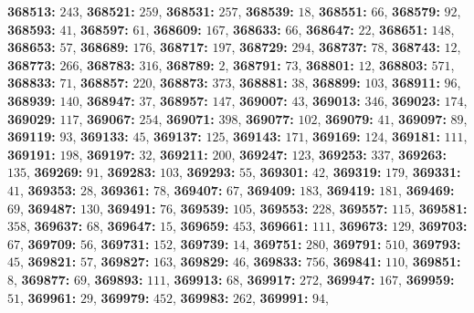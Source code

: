 \textsf{\bfseries 368513:} $243$, \textsf{\bfseries 368521:} $259$, \textsf{\bfseries 368531:} $257$, \textsf{\bfseries 368539:} $18$, \textsf{\bfseries 368551:} $66$, \textsf{\bfseries 368579:} $92$, \textsf{\bfseries 368593:} $41$, \textsf{\bfseries 368597:} $61$, \textsf{\bfseries 368609:} $167$, \textsf{\bfseries 368633:} $66$, \textsf{\bfseries 368647:} $22$, \textsf{\bfseries 368651:} $148$, \textsf{\bfseries 368653:} $57$, \textsf{\bfseries 368689:} $176$, \textsf{\bfseries 368717:} $197$, \textsf{\bfseries 368729:} $294$, \textsf{\bfseries 368737:} $78$, \textsf{\bfseries 368743:} $12$, \textsf{\bfseries 368773:} $266$, \textsf{\bfseries 368783:} $316$, \textsf{\bfseries 368789:} $2$, \textsf{\bfseries 368791:} $73$, \textsf{\bfseries 368801:} $12$, \textsf{\bfseries 368803:} $571$, \textsf{\bfseries 368833:} $71$, \textsf{\bfseries 368857:} $220$, \textsf{\bfseries 368873:} $373$, \textsf{\bfseries 368881:} $38$, \textsf{\bfseries 368899:} $103$, \textsf{\bfseries 368911:} $96$, \textsf{\bfseries 368939:} $140$, \textsf{\bfseries 368947:} $37$, \textsf{\bfseries 368957:} $147$, \textsf{\bfseries 369007:} $43$, \textsf{\bfseries 369013:} $346$, \textsf{\bfseries 369023:} $174$, \textsf{\bfseries 369029:} $117$, \textsf{\bfseries 369067:} $254$, \textsf{\bfseries 369071:} $398$, \textsf{\bfseries 369077:} $102$, \textsf{\bfseries 369079:} $41$, \textsf{\bfseries 369097:} $89$, \textsf{\bfseries 369119:} $93$, \textsf{\bfseries 369133:} $45$, \textsf{\bfseries 369137:} $125$, \textsf{\bfseries 369143:} $171$, \textsf{\bfseries 369169:} $124$, \textsf{\bfseries 369181:} $111$, \textsf{\bfseries 369191:} $198$, \textsf{\bfseries 369197:} $32$, \textsf{\bfseries 369211:} $200$, \textsf{\bfseries 369247:} $123$, \textsf{\bfseries 369253:} $337$, \textsf{\bfseries 369263:} $135$, \textsf{\bfseries 369269:} $91$, \textsf{\bfseries 369283:} $103$, \textsf{\bfseries 369293:} $55$, \textsf{\bfseries 369301:} $42$, \textsf{\bfseries 369319:} $179$, \textsf{\bfseries 369331:} $41$, \textsf{\bfseries 369353:} $28$, \textsf{\bfseries 369361:} $78$, \textsf{\bfseries 369407:} $67$, \textsf{\bfseries 369409:} $183$, \textsf{\bfseries 369419:} $181$, \textsf{\bfseries 369469:} $69$, \textsf{\bfseries 369487:} $130$, \textsf{\bfseries 369491:} $76$, \textsf{\bfseries 369539:} $105$, \textsf{\bfseries 369553:} $228$, \textsf{\bfseries 369557:} $115$, \textsf{\bfseries 369581:} $358$, \textsf{\bfseries 369637:} $68$, \textsf{\bfseries 369647:} $15$, \textsf{\bfseries 369659:} $453$, \textsf{\bfseries 369661:} $111$, \textsf{\bfseries 369673:} $129$, \textsf{\bfseries 369703:} $67$, \textsf{\bfseries 369709:} $56$, \textsf{\bfseries 369731:} $152$, \textsf{\bfseries 369739:} $14$, \textsf{\bfseries 369751:} $280$, \textsf{\bfseries 369791:} $510$, \textsf{\bfseries 369793:} $45$, \textsf{\bfseries 369821:} $57$, \textsf{\bfseries 369827:} $163$, \textsf{\bfseries 369829:} $46$, \textsf{\bfseries 369833:} $756$, \textsf{\bfseries 369841:} $110$, \textsf{\bfseries 369851:} $8$, \textsf{\bfseries 369877:} $69$, \textsf{\bfseries 369893:} $111$, \textsf{\bfseries 369913:} $68$, \textsf{\bfseries 369917:} $272$, \textsf{\bfseries 369947:} $167$, \textsf{\bfseries 369959:} $51$, \textsf{\bfseries 369961:} $29$, \textsf{\bfseries 369979:} $452$, \textsf{\bfseries 369983:} $262$, \textsf{\bfseries 369991:} $94$, 
